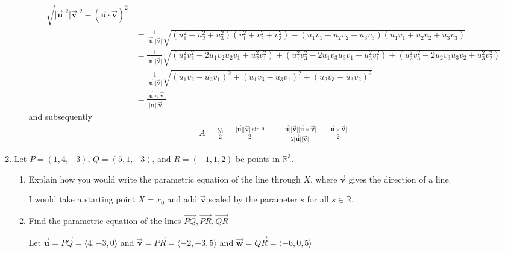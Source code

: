 \documentclass{letter}
\newcommand{\norm}[1]{\lvert #1 \rvert}
\newcommand{\Ve}[1]{\langle #1 \rangle}
\newcommand{\Vn}[1]{\vec{\bm{#1}}}
\newcommand\Que[1]{%
   \leavevmode\noindent
   #1
}
\newcommand\Ans[2][]{%
   \leavevmode\noindent
   {
       \begin{mdframed}[backgroundcolor=blue!10]
       #2
       \end{mdframed}
   }
}
\begin{document}
\begin{enumerate}
\begin{enumerate}[label=(\alph*)]
{\begin{align*}
           \sqrt{\norm{\Vn{u}}^2\norm{\Vn{v}}^2-(\Vn{u}\cdot\Vn{v})^2
           }\\
        &= \frac{1}{\norm{\Vn{u}}\norm{\Vn{v}}}
           \sqrt{(u_1^2+u_2^2+u_3^2)(v_1^2+v_2^2+v_3^2)-(u_1v_1+u_2v_2+u_3v_3)(u_1v_1+u_2v_2+u_3v_3)
           }\\
        &= \frac{1}{\norm{\Vn{u}}\norm{\Vn{v}}}
           \sqrt{(u_1^2v_2^2-2u_1v_2u_2v_1+u_2^2v_1^2)+
                 (u_1^2v_3^2-2u_1v_3u_3v_1+u_3^2v_1^2)+
                 (u_2^2v_3^2-2u_2v_3u_3v_2+u_3^2v_2^2)
           }\\ 
        &= \frac{1}{\norm{\Vn{u}}\norm{\Vn{v}}}
           \sqrt{(u_1v_2-u_2v_1)^2+
                 (u_1v_3-u_3v_1)^2+
                 (u_2v_3-u_3v_2)^2
           }\\
        &= \frac{\norm{\Vn{u} \times \Vn{v}}}{\norm{\Vn{u}}\norm{\Vn{v}}}
    \end{align*}
    and subsequently
    \begin{align*}
    A = \frac{bh}{2} = \frac{\norm{\Vn{u}}\norm{\Vn{v}}\sin{\theta}}{2}
     &= \frac{\norm{\Vn{u}}\norm{\Vn{v}}\norm{\Vn{u}\times\Vn{v}}}
         {2\norm{\Vn{u}}\norm{\Vn{v}}}
      = \frac{\norm{\Vn{u}\times\Vn{v}}}{2}
    \end{align*}
    }
    \end{enumerate}
    \newpage
    \item Let $P=(1,4,-3)$, $Q=(5,1,-3)$, and $R=(-1,1,2)$ be points in $\mathbb{R}^3$.
    \begin{enumerate}[label=(\alph*)]
    \item \Que{Explain how you would write the parametric equation of the line through $X$, where $\Vn{v}$ gives the direction of a line.}
    \Ans{
    I would take a starting point $X=x_0$ and add $\Vn{v}$ scaled by the parameter $s$ for all $s \in \mathbb{R}$. 
    }
    \item \Que{Find the parametric equation of the lines $\overrightarrow{PQ}, \overrightarrow{PR}, \overrightarrow{QR}$}
    \Ans{
        Let $\Vn{u} = \overrightarrow{PQ} = \Ve{ 4, -3, 0 }$ 
        and $\Vn{v} = \overrightarrow{PR} = \Ve{ -2,-3, 5 }$ 
        and $\Vn{w} = \overrightarrow{QR} = \Ve{ -6, 0, 5 }$
}
\end{enumerate}
\end{enumerate}
\end{document}
